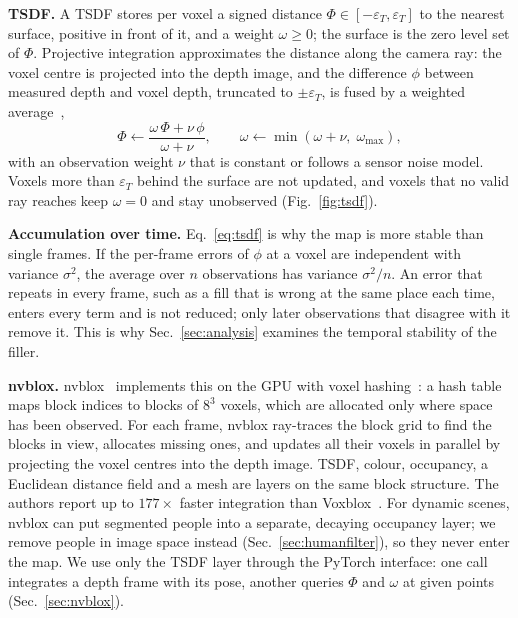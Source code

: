 \documentclass[conference]{IEEEtran}
\begin{document}
\textbf{TSDF.} A TSDF stores per voxel a signed distance
\(\Phi\in[-\varepsilon_T,\varepsilon_T]\) to the nearest surface, positive in
front of it, and a weight \(\omega\ge0\); the surface is the zero level set of
\(\Phi\). Projective integration approximates the distance along the camera ray:
the voxel centre is projected into the depth image, and the difference \(\phi\)
between measured depth and voxel depth, truncated to \(\pm\varepsilon_T\), is
fused by a weighted average~\cite{curless1996volumetric},
\begin{equation}
  \Phi \leftarrow \frac{\omega\,\Phi+\nu\,\phi}{\omega+\nu},\qquad
  \omega \leftarrow \min(\omega+\nu,\;\omega_{\max}),
  \label{eq:tsdf}
\end{equation}
with an observation weight \(\nu\) that is constant or follows a sensor noise
model. Voxels more than \(\varepsilon_T\) behind the surface are not updated, and
voxels that no valid ray reaches keep \(\omega=0\) and stay unobserved
(Fig.~\ref{fig:tsdf}).

\textbf{Accumulation over time.} Eq.~\eqref{eq:tsdf} is why the map is more
stable than single frames. If the per-frame errors of \(\phi\) at a voxel are
independent with variance \(\sigma^2\), the average over \(n\) observations has
variance \(\sigma^2/n\). An error that repeats in every frame, such as a fill
that is wrong at the same place each time, enters every term and is not
reduced; only later observations that disagree with it remove it. This is why
Sec.~\ref{sec:analysis} examines the temporal stability of the filler.

\textbf{nvblox.} nvblox~\cite{millane2024nvblox} implements this on the GPU with
voxel hashing~\cite{niessner2013voxelhashing}: a hash table maps block indices to
blocks of \(8^3\) voxels, which are allocated only where space has been
observed. For each frame, nvblox ray-traces the block grid to find the blocks
in view, allocates missing ones, and updates all their voxels in parallel by
projecting the voxel centres into the depth image. TSDF, colour, occupancy, a
Euclidean distance field and a mesh are layers on the same block structure.
The authors report up to \(177\times\) faster integration than
Voxblox~\cite{oleynikova2017voxblox}. For dynamic scenes, nvblox can put
segmented people into a separate, decaying occupancy layer; we remove people in
image space instead (Sec.~\ref{sec:humanfilter}), so they never enter the map.
We use only the TSDF layer through the PyTorch interface: one call integrates a
depth frame with its pose, another queries \(\Phi\) and \(\omega\) at given points
(Sec.~\ref{sec:nvblox}).
\end{document}
